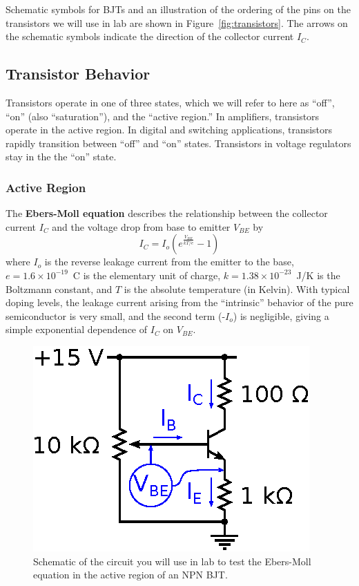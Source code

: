 \documentclass[11pt]{article}
\begin{document}
Schematic symbols for BJTs and an illustration of the ordering of the
pins on the transistors we will use in lab are shown in
Figure~\ref{fig:transistors}. The arrows on the schematic symbols
indicate the direction of the collector current $I_C$.

\subsection{Transistor Behavior}

Transistors operate in one of three states, which we will refer to
here as ``off'', ``on'' (also ``saturation''), and the ``active
region.'' In amplifiers, transistors operate in the active region. In
digital and switching applications, transistors rapidly transition
between ``off'' and ``on'' states. Transistors in voltage regulators
stay in the the ``on'' state.

\subsubsection*{Active Region}

The \textbf{Ebers-Moll equation} describes the relationship between
the collector current $I_C$ and the voltage drop from base to emitter
$V_{BE}$ by 
\begin{equation}
  I_C = I_o \left( e^{\frac{V_{BE}}{kT/e}} - 1 \right)
  \label{eq:ebersmoll}
\end{equation}
where $I_o$ is the reverse leakage current from the emitter to the
base, $e = 1.6 \times 10^{-19}$~C is the elementary unit of charge,
$k = 1.38 \times 10^{-23}$~J/K is the Boltzmann constant, and $T$ is the
absolute temperature (in Kelvin). With typical doping levels, the
leakage current arising from the ``intrinsic'' behavior of the pure
semiconductor is very small, and the second term (-$I_o$) is
negligible, giving a simple exponential dependence of $I_C$ on
$V_{BE}$.

\begin{figure}[ht]
  \begin{center}
    \includegraphics{ebersmollcircuit.eps}
    \caption{Schematic of the circuit you will use in lab to
      test the Ebers-Moll equation in the active region of an NPN
      BJT.}
    \label{fig:ebersmollcircuit}
  \end{center}
\end{figure}
\end{document}
